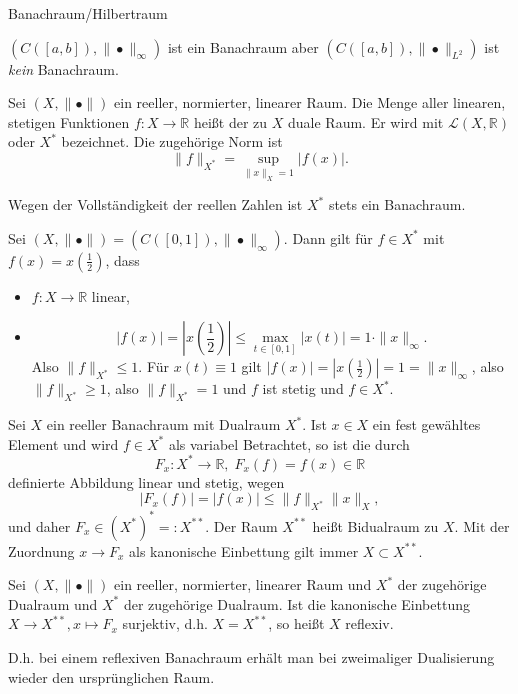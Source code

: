 \documentclass[main.tex]{subfiles}
\begin{document}
\begin{mydef}\label{2.13}
Banachraum/Hilbertraum
\end{mydef}
\begin{bsp*}
$\left( C([a,b]), \|	• \|_\infty \right)$ ist ein Banachraum aber $\left( C([a,b]), \|•\|_{L^2} \right)$ ist \emph{kein} Banachraum.
\end{bsp*}


\begin{mydef}\label{2.14}
Sei $(X, \| 	• \|)$ ein reeller, normierter, linearer Raum. Die Menge aller linearen, stetigen Funktionen $f\colon X\to ℝ$ heißt der zu $X$ duale Raum. Er wird mit $\mathcal L(X, ℝ)$ oder $X^*$ bezeichnet. Die zugehörige Norm ist
$$\| f\|_{X^*} = \sup_{\|x\|_X = 1} | f(x)|.$$
\end{mydef}
\begin{bem*}
Wegen der Vollständigkeit der reellen Zahlen ist $X^*$ stets ein Banachraum.
\end{bem*}

\begin{bsp}\label{2.15}
Sei $(X, \|•\|) = \left( C([0,1]), \|•\|_∞ \right)$. Dann gilt für $f\in X^*$ mit $f(x) = x \left( \frac{1}{2} \right)$, dass
\begin{itemize}
\item $f\colon X \to ℝ$ linear,
\item $$|f(x)| = \left| x\left( \frac{1}{2} \right)\right|\le \max_{t\in [0,1]} |x(t)| = 1\cdot \| x \|_∞.$$
Also $\| f\|_{X^*} \le 1.$
Für $x(t) \equiv 1$ gilt $|f(x)| = \left| x\left( \frac{1}{2}\right) \right| = 1 = \| x\|_∞$, also $\|f\|_{X^*} \ge 1$, also $\| f\|_{X^*} = 1$ und $f$ ist stetig und $f\in X^*$. 
\end{itemize}
\end{bsp}

Sei $X$ ein reeller Banachraum mit Dualraum $X^*$. Ist $x\in X$ ein fest gewähltes Element und wird $f\in X^*$ als variabel Betrachtet, so ist die durch 
$$F_x\colon X^* \to ℝ, \; F_x(f) = f(x)\in ℝ$$
definierte Abbildung linear und stetig, wegen
$$|F_x(f)| = |f(x)|\le \| f\|_{X^*} \| x\|_X,$$
und daher $F_x\in \left( X^* \right)^* =: X^{**}.$
Der Raum $X^{**}$ heißt Bidualraum zu $X$. Mit der Zuordnung $x\to F_x$ als kanonische Einbettung gilt immer $X\subset X^{**}.$

\begin{mydef}
Sei $(X, \| • \|)$ ein reeller, normierter, linearer Raum und $X^*$ der zugehörige Dualraum und $X^*$ der zugehörige Dualraum. Ist die kanonische Einbettung $X \to X^{**}, x\mapsto F_x$ surjektiv, d.h. $X=X^{**}$, so heißt $X$ reflexiv.
\end{mydef}
D.h. bei einem reflexiven Banachraum erhält man bei zweimaliger Dualisierung wieder den ursprünglichen Raum.
\end{document}
